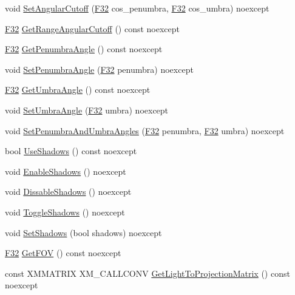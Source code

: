 \begin{DoxyCompactItemize}
\item 
void \hyperlink{classmage_1_1rendering_1_1_spot_light_a92a3b92e8a789c038c0f9058b1ff5a48}{Set\+Angular\+Cutoff} (\hyperlink{namespacemage_aa97e833b45f06d60a0a9c4fc22ae02c0}{F32} cos\+\_\+penumbra, \hyperlink{namespacemage_aa97e833b45f06d60a0a9c4fc22ae02c0}{F32} cos\+\_\+umbra) noexcept
\item 
\hyperlink{namespacemage_aa97e833b45f06d60a0a9c4fc22ae02c0}{F32} \hyperlink{classmage_1_1rendering_1_1_spot_light_abd442757ce094619b8f4c050e54403e1}{Get\+Range\+Angular\+Cutoff} () const noexcept
\item 
\hyperlink{namespacemage_aa97e833b45f06d60a0a9c4fc22ae02c0}{F32} \hyperlink{classmage_1_1rendering_1_1_spot_light_a17d63e6f944d83eaca821476de70d5bc}{Get\+Penumbra\+Angle} () const noexcept
\item 
void \hyperlink{classmage_1_1rendering_1_1_spot_light_a8dac22c53c71001a6c43ab2a34ace206}{Set\+Penumbra\+Angle} (\hyperlink{namespacemage_aa97e833b45f06d60a0a9c4fc22ae02c0}{F32} penumbra) noexcept
\item 
\hyperlink{namespacemage_aa97e833b45f06d60a0a9c4fc22ae02c0}{F32} \hyperlink{classmage_1_1rendering_1_1_spot_light_a2ad4020c60fcfd2fca7568fbefa601f0}{Get\+Umbra\+Angle} () const noexcept
\item 
void \hyperlink{classmage_1_1rendering_1_1_spot_light_a65c753804a53c6b9fc1c58bf036a75c1}{Set\+Umbra\+Angle} (\hyperlink{namespacemage_aa97e833b45f06d60a0a9c4fc22ae02c0}{F32} umbra) noexcept
\item 
void \hyperlink{classmage_1_1rendering_1_1_spot_light_aa2e2c75dabaf5d33141d9b8a1163f317}{Set\+Penumbra\+And\+Umbra\+Angles} (\hyperlink{namespacemage_aa97e833b45f06d60a0a9c4fc22ae02c0}{F32} penumbra, \hyperlink{namespacemage_aa97e833b45f06d60a0a9c4fc22ae02c0}{F32} umbra) noexcept
\item 
bool \hyperlink{classmage_1_1rendering_1_1_spot_light_a5081e3b99bd869d6c241b48666917cd4}{Use\+Shadows} () const noexcept
\item 
void \hyperlink{classmage_1_1rendering_1_1_spot_light_ace198989b91c5b4ca590dabef5b88e25}{Enable\+Shadows} () noexcept
\item 
void \hyperlink{classmage_1_1rendering_1_1_spot_light_a11897283e223ed345a2d04738e7fc267}{Dissable\+Shadows} () noexcept
\item 
void \hyperlink{classmage_1_1rendering_1_1_spot_light_a4e6412e05d894a97409c23d8d088cabf}{Toggle\+Shadows} () noexcept
\item 
void \hyperlink{classmage_1_1rendering_1_1_spot_light_af1f1d3aee8bdcda50d16f4b0551e4728}{Set\+Shadows} (bool shadows) noexcept
\item 
\hyperlink{namespacemage_aa97e833b45f06d60a0a9c4fc22ae02c0}{F32} \hyperlink{classmage_1_1rendering_1_1_spot_light_a22527d940bc7601285429b36e8d97490}{Get\+F\+OV} () const noexcept
\item 
const X\+M\+M\+A\+T\+R\+IX X\+M\+\_\+\+C\+A\+L\+L\+C\+O\+NV \hyperlink{classmage_1_1rendering_1_1_spot_light_ad617d1c098e2ca222a9736b8c45fa0c8}{Get\+Light\+To\+Projection\+Matrix} () const noexcept
\end{DoxyCompactItemize}
